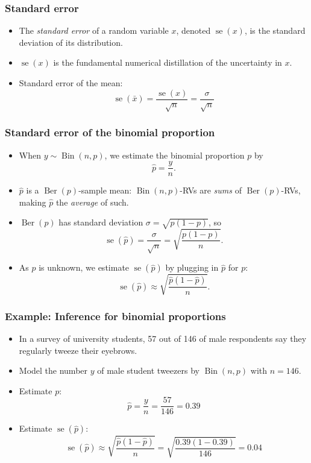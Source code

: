 \documentclass{beamer}
\DeclareMathOperator{\stderr}{se}
\DeclareMathOperator{\Ber}{Ber}
\DeclareMathOperator{\Bin}{Bin}
\begin{document}
\begin{frame}
    \frametitle{Standard error}
    
    \begin{itemize}
        \item The \emph{standard error} of a random variable $x$, denoted $\stderr(x)$, is the standard deviation of its distribution.
        \item $\stderr(x)$ is the fundamental numerical distillation of the uncertainty in $x$.
        \item Standard error of the mean:
        \[
            \stderr(\bar{x}) = \frac{\stderr(x)}{\sqrt{n}} = \frac{\sigma}{\sqrt{n}}
        \]
        
    \end{itemize}
\end{frame}
\begin{frame}
    \frametitle{Standard error of the binomial proportion}
    \begin{itemize}
        \item When $y\sim \Bin(n, p)$, we estimate the binomial proportion $p$ by
        \[
        \hat{p} = \frac{y}{n}.
        \]

        \item $\hat{p}$ is a $\Ber(p)$-sample mean: $\Bin(n, p)$-RVs are \emph{sums} of $\Ber(p)$-RVs, making $\hat{p}$
        the \emph{average} of such.
        
        \item $\Ber(p)$ has standard deviation $\sigma=\sqrt{p(1-p)}$, so
        \[
        \stderr(\hat{p}) = \frac{\sigma}{\sqrt{n}} = \sqrt{\frac{p(1-p)}{n}}.
        \]

        \item As $p$ is unknown, we estimate $\stderr(\hat{p})$ by plugging in $\hat{p}$ for $p$:
        \[
        \stderr(\hat{p}) \approx \sqrt{\frac{\hat{p}(1-\hat{p})}{n}}.
        \]
    \end{itemize}
\end{frame}

\begin{frame}
    \frametitle{Example: Inference for binomial proportions}
    \begin{itemize}
        \item In a survey of university students, 57 out of 146 of male respondents say they regularly tweeze their eyebrows.
        \item Model the number $y$ of male student tweezers by $\Bin(n, p)$ with $n=146$.
        \item Estimate $p$:
        \[
        \hat{p} = \frac{y}{n}=\frac{57}{146} = 0.39
        \]
        \item Estimate $\stderr(\hat{p})$:
        \[
        \stderr(\hat{p}) \approx \sqrt{\frac{\hat{p}(1-\hat{p})}{n}} = 
        \sqrt{\frac{0.39(1-0.39)}{146}}=0.04
        \]
    \end{itemize}
\end{frame}
\end{document}
